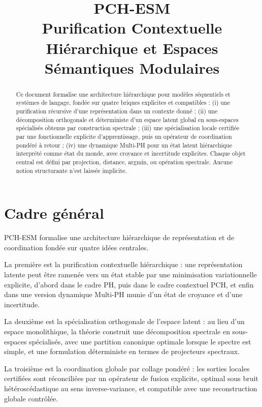 \documentclass[11pt,a4paper]{article}
\title{PCH-ESM\\
\large Purification Contextuelle Hiérarchique et Espaces Sémantiques Modulaires}
\author{}
\date{}
\newcommand{\1}{\mathbf 1}
\begin{document}
\maketitle

\begin{abstract}
Ce document formalise une architecture hiérarchique pour modèles séquentiels et systèmes de langage, fondée sur quatre briques explicites et compatibles :
(i) une purification récursive d'une représentation dans un contexte donné ;
(ii) une décomposition orthogonale et déterministe d'un espace latent global en sous-espaces spécialisés obtenus par construction spectrale ;
(iii) une spécialisation locale certifiée par une fonctionnelle explicite d'apprentissage, puis un opérateur de coordination pondéré à retour ;
(iv) une dynamique Multi-PH pour un état latent hiérarchique interprété comme état du monde, avec croyance et incertitude explicites.
Chaque objet central est défini par projection, distance, argmin, ou opération spectrale. Aucune notion structurante n'est laissée implicite.
\end{abstract}

\tableofcontents

\section{Cadre général}


PCH-ESM formalise une architecture hiérarchique de représentation et de coordination fondée sur quatre idées centrales.

La première est la purification contextuelle hiérarchique : une représentation latente peut être ramenée vers un état stable par une minimisation variationnelle explicite, d’abord dans le cadre PH, puis dans le cadre contextuel PCH, et enfin dans une version dynamique Multi-PH munie d’un état de croyance et d’une incertitude.

La deuxième est la spécialisation orthogonale de l’espace latent : au lieu d’un espace monolithique, la théorie construit une décomposition spectrale en sous-espaces spécialisés, avec une partition canonique optimale lorsque le spectre est simple, et une formulation déterministe en termes de projecteurs spectraux.

La troisième est la coordination globale par collage pondéré : les sorties locales certifiées sont réconciliées par un opérateur de fusion explicite, optimal sous bruit hétéroscédastique au sens inverse-variance, et compatible avec une reconstruction globale contrôlée.
\end{document}

